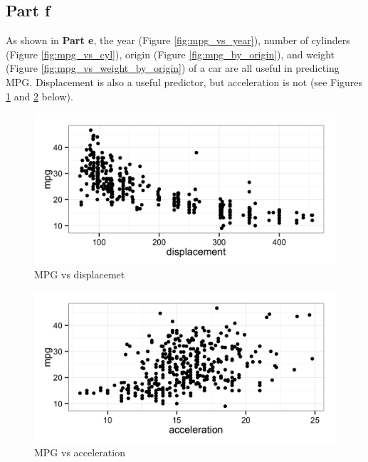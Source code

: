 \documentclass[11pt]{article}
\begin{document}
\subsection*{Part f}

As shown in \textbf{Part e}, the year (Figure \ref{fig:mpg_vs_year}), number of cylinders (Figure \ref{fig:mpg_vs_cyl}), origin (Figure \ref{fig:mpg_by_origin}), and weight (Figure \ref{fig:mpg_vs_weight_by_origin}) of a car are all useful in predicting MPG. Displacement is also a useful predictor, but acceleration is not (see Figures \ref{fig:mpg_by_disp} and \ref{fig:mpg_by_acc} below).

\begin{figure}[H]
	\centering
	\includegraphics[width=5in]{9e_mpg_vs_disp.png}
	\caption{MPG vs displacemet}
	\label{fig:mpg_by_disp}
\end{figure}

\begin{figure}[H]
	\centering
	\includegraphics[width=5in]{9e_mpg_vs_acc.png}
	\caption{MPG vs acceleration}
	\label{fig:mpg_by_acc}
\end{figure}
\end{document}
